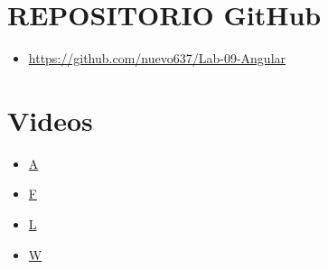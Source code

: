 \documentclass{article}
\begin{document}
	\clearpage




	\section{REPOSITORIO GitHub}

	\begin{itemize}
		\item \url{https://github.com/nuevo637/Lab-09-Angular}
	\end{itemize}
	
	\section{Videos}
	\begin{itemize}
		\item \url{A}
		\item \url{F}
		\item \url{L}
		\item \url{W}
	\end{itemize}
\end{document}

